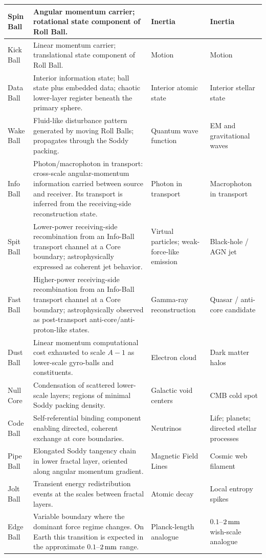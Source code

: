 \documentclass[11pt,a4paper]{article}
\begin{document}
\begin{center}
\begin{longtable}{|C{2.4cm}|L{6.2cm}|C{2.4cm}|C{3.0cm}|}
  \hline
  Spin Ball  & Angular momentum carrier; rotational state component of Roll Ball. & Inertia & Inertia \\
  \hline
  Kick Ball  & Linear momentum carrier; translational state component of Roll Ball. & Motion & Motion \\
  \hline
  Data Ball  & Interior information state; ball state plus embedded data; chaotic lower-layer register beneath the primary sphere. & Interior atomic state & Interior stellar state \\
  \hline
  Wake Ball  & Fluid-like disturbance pattern generated by moving Roll Balls; propagates through the Soddy packing. & Quantum wave function & EM and gravitational waves \\
  \hline
  Info Ball  & Photon/macrophoton in transport: cross-scale angular-momentum information carried between source and receiver. Its transport is inferred from the receiving-side reconstruction state. & Photon in transport & Macrophoton in transport \\
  \hline
  Spit Ball  & Lower-power receiving-side recombination from an Info-Ball transport channel at a Core boundary; astrophysically expressed as coherent jet behavior. & Virtual particles; weak-force-like emission & Black-hole / AGN jet \\
  \hline
  Fast Ball  & Higher-power receiving-side recombination from an Info-Ball transport channel at a Core boundary; astrophysically observed as post-transport anti-core/anti-proton-like states. & Gamma-ray reconstruction & Quasar / anti-core candidate \\
  \hline
  Dust Ball  & Linear momentum computational cost exhausted to scale $A{-}1$ as lower-scale gyro-balls and constituents. & Electron cloud & Dark matter halos \\
  \hline
  Null Core  & Condensation of scattered lower-scale layers; regions of minimal Soddy packing density. & Galactic void centers & CMB cold spot \\
  \hline
  Code Ball  & Self-referential binding component enabling directed, coherent exchange at core boundaries. & Neutrinos & Life; planets; directed stellar processes \\
  \hline
  Pipe Ball  & Elongated Soddy tangency chain in lower fractal layer, oriented along angular momentum gradient. & Magnetic Field Lines & Cosmic web filament \\
  \hline
  Jolt Ball  & Transient energy redistribution events at the scales between fractal layers. & Atomic decay & Local entropy spikes \\
  \hline
  Edge Ball  & Variable boundary where the dominant force regime changes. On Earth this transition is expected in the approximate \(0.1\)--\(2\,{\rm mm}\) range. & Planck-length analogue & \(0.1\)--\(2\,{\rm mm}\) wish-scale analogue \\
  \hline

  \end{longtable}
  \normalsize
  \end{center}
\end{document}
